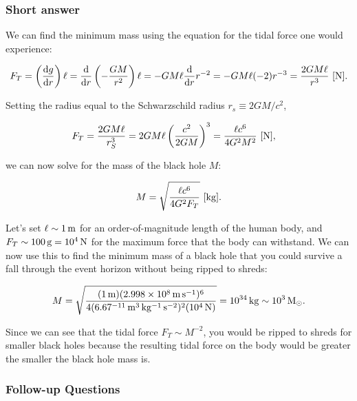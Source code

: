 \documentclass[a4paper,10pt]{article}
\begin{document}
\subsubsection{Short answer}

We can find the minimum mass using the equation for the tidal force one would experience:

\begin{align*}
    F_T = \left(\frac{{\rm d}g}{{\rm d}r}\right)\ell = \frac{\rm d}{{\rm d}r} \left(-\frac{GM}{r^2}\right)\ell = -GM\ell \frac{\rm d}{{\rm d}r}r^{-2} = -GM\ell(-2)r^{-3} = \frac{2GM\ell}{r^3} ~ [{\rm N}].
\end{align*}

{\noindent}Setting the radius equal to the Schwarzschild radius $r_s\equiv2GM/c^2$,

\begin{align*}
    F_T &= \frac{2GM\ell}{r_S^3} = 2GM\ell \left(\frac{c^2}{2GM}\right)^3 = \frac{\ell c^6}{4G^2M^2} ~ [{\rm N}],
\end{align*}

{\noindent}we can now solve for the mass of the black hole $M$:

\begin{align*}
    M = \sqrt{\frac{\ell c^6}{4G^2F_T}} ~ [{\rm kg}].
\end{align*}

{\noindent}Let's set $\ell\sim1\,{\rm m}$ for an order-of-magnitude length of the human body, and $F_T\sim100\,{\rm g}=10^4\,{\rm N}$ for the maximum force that the body can withstand. We can now use this to find the minimum mass of a black hole that you could survive a fall through the event horizon without being ripped to shreds:

\begin{align*}
    M = \sqrt{\frac{(1\,{\rm m})(2.998\times10^8\,{\rm m\,s^{-1}})^6}{4(6.67\time10^{-11}\,{\rm m^3\,kg^{-1}\,s^{-2}})^2(10^4\,{\rm N})}} = 10^{34}\,{\rm kg} \sim 10^3\,{\rm M_\odot}.
\end{align*}

{\noindent}Since we can see that the tidal force $F_T\sim M^{-2}$, you would be ripped to shreds for smaller black holes because the resulting tidal force on the body would be greater the smaller the black hole mass is.

\subsubsection{Follow-up Questions}
\end{document}
